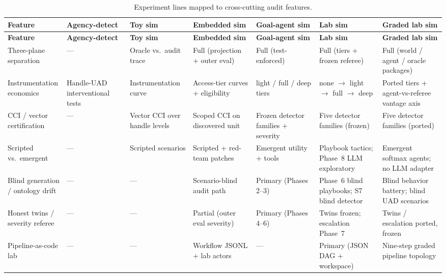 \begin{landscape}
\footnotesize
\setlength{\tabcolsep}{6pt}
\setlength{\LTleft}{0pt}
\setlength{\LTright}{0pt}
\renewcommand{\arraystretch}{1.18}

\begin{longtable}{@{}L{0.12\linewidth}L{0.1467\linewidth}L{0.1467\linewidth}L{0.1467\linewidth}L{0.1467\linewidth}L{0.1467\linewidth}L{0.1467\linewidth}@{}}
\caption{Experiment lines mapped to cross-cutting audit features.}\label{tab:appn-bridge-features}\\
\toprule
\textbf{Feature} & \textbf{Agency-detect} & \textbf{Toy sim} & \textbf{Embedded sim} & \textbf{Goal-agent sim} & \textbf{Lab sim} & \textbf{Graded lab sim} \\
\midrule
\endfirsthead
\toprule
\textbf{Feature} & \textbf{Agency-detect} & \textbf{Toy sim} & \textbf{Embedded sim} & \textbf{Goal-agent sim} & \textbf{Lab sim} & \textbf{Graded lab sim} \\
\midrule
\endhead
\bottomrule
\endfoot
Three-plane separation & --- & Oracle vs.\ audit trace & Full (projection + outer eval) & Full (test-enforced) & Full (tiers + frozen referee) & Full (world / agent / oracle packages) \\
Instrumentation economics & Handle-UAD interventional tests & Instrumentation curve & Access-tier curves + eligibility & light / full / deep tiers & none $\to$ light $\to$ full $\to$ deep & Ported tiers + agent-vs-referee vantage axis \\
CCI / vector certification & --- & Vector CCI over handle levels & Scoped CCI on discovered unit & Frozen detector families + severity & Five detector families (frozen) & Five detector families (ported) \\
Scripted vs.\ emergent & --- & Scripted scenarios & Scripted + red-team patches & Emergent utility + tools & Playbook tactics; Phase~8 LLM exploratory & Emergent softmax agents; no LLM adapter \\
Blind generation / ontology drift & --- & --- & Scenario-blind audit path & Primary (Phases 2--3) & Phase~6 blind playbooks; S7 blind detector & Blind behavior battery; blind UAD scenarios \\
Honest twins / severity referee & --- & --- & Partial (outer eval severity) & Primary (Phases 4--6) & Twins frozen; escalation Phase~7 & Twins / escalation ported, frozen \\
Pipeline-as-code lab & --- & --- & Workflow JSONL + lab actors & --- & Primary (JSON DAG + workspace) & Nine-step graded pipeline topology \\

\end{longtable}
\end{landscape}
